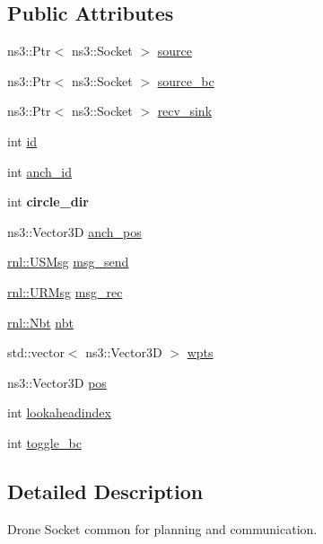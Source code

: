 \subsection*{Public Attributes}
\begin{DoxyCompactItemize}
\item 
ns3\+::\+Ptr$<$ ns3\+::\+Socket $>$ \hyperlink{structrnl_1_1DroneSoc_a1d4ae61d59f86c1efe46ca221711f07e}{source}
\item 
ns3\+::\+Ptr$<$ ns3\+::\+Socket $>$ \hyperlink{structrnl_1_1DroneSoc_aedfa903020617a408194c3a1b2bf8f22}{source\+\_\+bc}
\item 
ns3\+::\+Ptr$<$ ns3\+::\+Socket $>$ \hyperlink{structrnl_1_1DroneSoc_ab7620aceca921deff3b7e929bcf539a9}{recv\+\_\+sink}
\item 
int \hyperlink{structrnl_1_1DroneSoc_a1e6c71ed4e33fedcf54e7d1dd28657df}{id}
\item 
int \hyperlink{structrnl_1_1DroneSoc_a4d79451257929fcbaa69092b40af3077}{anch\+\_\+id}
\item 
\mbox{\label{structrnl_1_1DroneSoc_a3c7d1e51b1e69f01ad7835aaeea11178}} 
int {\bfseries circle\+\_\+dir}
\item 
ns3\+::\+Vector3D \hyperlink{structrnl_1_1DroneSoc_a53076839aa6e66664611d82d848d864b}{anch\+\_\+pos}
\item 
\hyperlink{structrnl_1_1USMsg}{rnl\+::\+U\+S\+Msg} \hyperlink{structrnl_1_1DroneSoc_afc38c88754777ceef7195a4eacb870b9}{msg\+\_\+send}
\item 
\hyperlink{structrnl_1_1URMsg}{rnl\+::\+U\+R\+Msg} \hyperlink{structrnl_1_1DroneSoc_abc05fd0c4b80eb3bb6561c6b3d030797}{msg\+\_\+rec}
\item 
\hyperlink{structrnl_1_1Nbt}{rnl\+::\+Nbt} \hyperlink{structrnl_1_1DroneSoc_ae8065f9f2549546f32f8afdd4417dc58}{nbt}
\item 
std\+::vector$<$ ns3\+::\+Vector3D $>$ \hyperlink{structrnl_1_1DroneSoc_af6f5003ab01dd213cfed46f595e68694}{wpts}
\item 
ns3\+::\+Vector3D \hyperlink{structrnl_1_1DroneSoc_acd4150016d89ea9846c2c735c75470a0}{pos}
\item 
int \hyperlink{structrnl_1_1DroneSoc_a83abdfd1bc5cedf1a4effe48918a49a2}{lookaheadindex}
\item 
int \hyperlink{structrnl_1_1DroneSoc_a0551bc4498f75645a7a0fed0c3d2fb00}{toggle\+\_\+bc}
\end{DoxyCompactItemize}


\subsection{Detailed Description}
Drone Socket common for planning and communication. 

